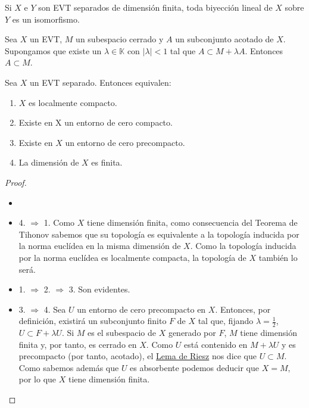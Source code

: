 \begin{teorema}\label{thm:d05}
Si $X$ e $Y$ son EVT separados de dimensión finita, toda biyección lineal de $X$ sobre $Y$ es un isomorfismo. 
\end{teorema}

\begin{lema}\label{lm:d01}
Sea $X$ un EVT, $M$ un subespacio cerrado y $A$ un subconjunto acotado de $X$. Supongamos que existe un $\lambda\in \mathds{K}$ con $|\lambda| <1$ tal que $A\subset M + \lambda A$. Entonces $A\subset M$. 
\end{lema}
\begin{teorema}\label{thm:d04}
Sea $X$ un EVT separado. Entonces equivalen:
\begin{enumerate}


\item $X$ es localmente compacto.
\item Existe en X un entorno de cero compacto.
\item Existe en $X$ un entorno de cero precompacto.
\item La dimensión de $X$ es finita.
\end{enumerate}
\end{teorema}
\begin{proof}
\begin{itemize}
\item[]
\item 4. $\Rightarrow$ 1. Como $X$ tiene dimensión finita, como consecuencia del Teorema de Tihonov sabemos que su topología es equivalente a la topología inducida por la norma euclídea en la misma dimensión de $X$. Como la topología inducida por la norma euclídea es localmente compacta, la topología de $X$ también lo será. 
\item 1. $\Rightarrow$ 2. $\Rightarrow$ 3. Son evidentes.
\item 3. $\Rightarrow$ 4. Sea $U$ un entorno de cero precompacto en $X$. Entonces, por definición, existirá un subconjunto finito $F$ de $X$ tal que, fijando $\lambda=\frac{1}{2}$, $U\subset F + \lambda U$. Si $M$ es el subespacio de $X$ generado por $F$, $M$ tiene dimensión finita y, por tanto, es cerrado en $X$. Como $U$ está contenido en $M+\lambda U$ y es precompacto (por tanto, acotado), el \hyperref[lm:d01]{Lema de Riesz} nos dice que $U\subset M$. Como sabemos además que $U$ es absorbente podemos deducir que $X=M$, por lo que $X$ tiene dimensión finita. 
\end{itemize}
\end{proof}

